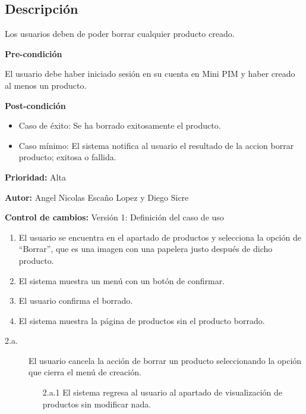 {}

\subsection*{Descripción}
Los usuarios deben de poder borrar cualquier producto creado.
\par
\vspace{0.15cm}

\textbf{Pre-condición}\par
El usuario debe haber iniciado sesión en su cuenta en Mini PIM y haber creado al menos un producto.\par
\vspace{0.15cm}

\textbf{Post-condición}
\begin{itemize}
    \item Caso de éxito: Se ha borrado exitosamente el producto.
    \item Caso mínimo: El sistema notifica al usuario el resultado de la accion borrar producto; exitosa o fallida.
\end{itemize}

\textbf{Prioridad: }
Alta
\vspace{0.15cm}

\textbf{Autor: }
Angel Nicolas Escaño Lopez y Diego Sicre\par
\vspace{0.15cm}

\textbf{Control de cambios: } Versión 1: Definición del caso de uso

\begin{enumerate}
    \item El usuario se encuentra en el apartado de productos y selecciona la opción de “Borrar”, que es una imagen con una papelera justo después de dicho producto.
    \item El sistema muestra un menú con un botón de confirmar.
    \item El usuario confirma el borrado.
    \item El sistema muestra la página de productos sin el producto borrado.
\end{enumerate}

\begin{description}
    \item[2.a.] El usuario cancela la acción de borrar un producto seleccionando la opción que cierra el menú de creación.
    \begin{enumerate}
        \item[2.a.1] El sistema regresa al usuario al apartado de visualización de productos sin modificar nada.
    \end{enumerate}
\end{description}

